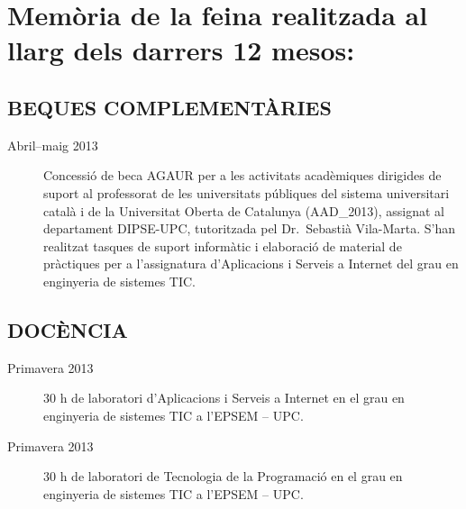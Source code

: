 
\renewcommand*\descriptionlabel[1]{\hspace\labelsep\normalfont #1:}

\section*{Memòria de la feina realitzada al llarg dels darrers 12 mesos:}







\subsection*{BEQUES COMPLEMENTÀRIES}

\begin{description}

\item[Abril--maig 2013] Concessió de beca AGAUR per a les activitats
  acadèmiques dirigides de suport al professorat de les universitats
  públiques del sistema universitari català i de la Universitat Oberta
  de Catalunya (AAD\_2013), assignat al departament DIPSE-UPC,
  tutoritzada pel Dr.\ Sebastià Vila-Marta.  S'han realitzat tasques
  de suport informàtic i elaboració de material de pràctiques per a
  l'assignatura d'Aplicacions i Serveis a Internet del grau en
  enginyeria de sistemes TIC.
\end{description}


\subsection*{DOCÈNCIA}

\begin{description}

\item[Primavera 2013] 30 h de laboratori d'Aplicacions i Serveis a
  Internet en el grau en enginyeria de sistemes TIC a l'EPSEM -- UPC.

\item[Primavera 2013] 30 h de laboratori de Tecnologia de la
  Programació en el grau en enginyeria de sistemes TIC a l'EPSEM --
  UPC.

\end{description}




